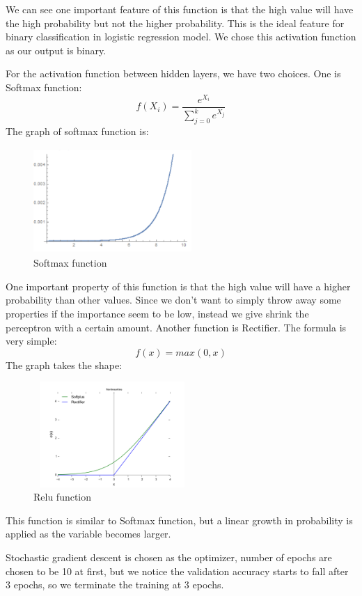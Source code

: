\documentclass{article}
\begin{document}
We can see one important feature of this function is that the high value will have the high probability but not the higher probability. This is the ideal feature for binary classification in logistic regression model. We chose this activation function as our output is binary.

For the activation function between hidden layers, we have two choices. One is Softmax function: 
\begin{equation}
f(X_i)=\frac{e^{X_i}}{\sum_{j=0}^{k}e^{X_j}}
\end{equation}
The graph of softmax function is:
\begin{figure}[h]
 \centering
 \includegraphics[width=6cm, height=4cm]{softmax.png}
 \caption{Softmax function}
\end{figure}

One important property of this function is that the high value will have a higher probability than other values. Since we don’t want to simply throw away some properties if the importance seem to be low, instead we give shrink the perceptron with a certain amount. 
Another function is Rectifier. The formula is very simple:
\begin{equation}
f(x)=max(0,x)
\end{equation}
 The graph takes the shape:
 \begin{figure}[h]
 \centering
 \includegraphics[width=6cm, height=4cm]{relu.png}
 \caption{Relu function}
\end{figure}

This function is similar to Softmax function, but a linear growth in probability is applied as the variable becomes larger.

Stochastic gradient descent is chosen as the optimizer, number of epochs are chosen to be 10 at first, but we notice the validation accuracy starts to fall after 3 epochs, so we terminate the training at 3 epochs. 
\end{document}
